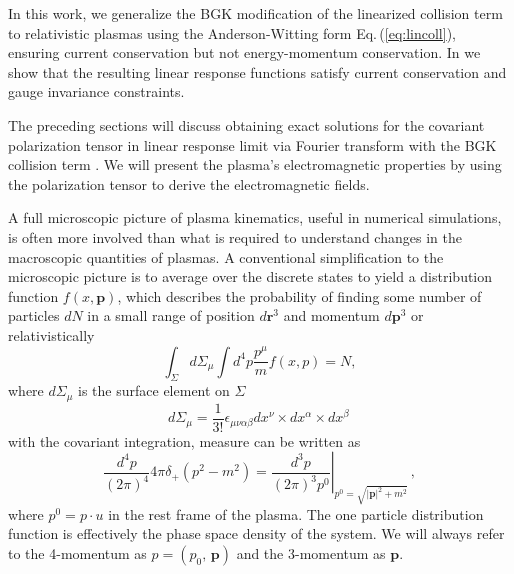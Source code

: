 In this work, we generalize the BGK modification of the linearized collision term to relativistic plasmas using the Anderson-Witting form Eq.\,(\ref{eq:lincoll}), ensuring current conservation  but not energy-momentum conservation. In \cite{Formanek:2021blc} we show that the resulting linear response functions satisfy current conservation and gauge invariance constraints. 

The preceding sections will discuss obtaining exact solutions for the covariant polarization tensor in linear response limit via Fourier transform with the BGK collision term . We will present the plasma's electromagnetic properties by using the polarization tensor to derive the electromagnetic fields.

\label{sec:CKT}
A full microscopic picture of plasma kinematics, useful in numerical simulations, is often more involved than what is required to understand changes in the macroscopic quantities of plasmas. A conventional simplification to the microscopic picture is to average over the discrete states to yield a distribution function $f(x,\boldsymbol{p})$, which describes the probability of finding some number of particles $dN$ in a small range of position $d\mathbf{r}^3$ and momentum $d\boldsymbol{p}^3$ or relativistically~\cite{Hakim:2011bk}
\begin{equation}
    \int_{\Sigma}d\Sigma_{\mu}\int  d^4p\frac{p^\mu}{m}f(x,p) = N,
\end{equation}
where $d\Sigma_\mu$ is the surface element on $\Sigma$
\begin{equation}
    d\Sigma_\mu = \frac{1}{3!}\epsilon_{\mu \nu \alpha\beta} dx^\nu \times dx^\alpha\times dx^\beta\,
\end{equation}
with the covariant integration, measure can be written as
\begin{equation}\label{eq:measure} 
 \frac{d^4p}{(2\pi)^4}4\pi \delta_+(p^2-m^2) = \left.\frac{d^3p}{(2\pi)^3p^0}\right|_{p^0 = \sqrt{|\boldsymbol{p}|^2 + m^2}} \,,
\end{equation}
where $p^0 = p \cdot u$ in the rest frame of the plasma. The one particle distribution function is effectively the phase space density of the system. We will always refer to the 4-momentum as $p = (p_0, \, \boldsymbol{p})$ and the 3-momentum as $\boldsymbol{p}$.

